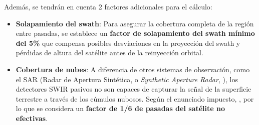 Además, se tendrán en cuenta 2 factores adicionales para el cálculo:
\begin{itemize}
    \item \textbf{Solapamiento del swath}: Para asegurar la cobertura completa de la región entre pasadas, se establece un \textbf{factor de solapamiento del swath mínimo del 5\%} que compensa posibles desviaciones en la proyección del swath y pérdidas de altura del satélite antes de la reinyección orbital.
    \item \textbf{Cobertura de nubes}: A diferencia de otros sistemas de observación, como el SAR (Radar de Apertura Sintética, o \textit{Synthetic Aperture Radar}, \cite{lou2020sar}), los detectores SWIR pasivos no son capaces de capturar la señal de la superficie terrestre a través de los cúmulos nubosos. Según el enunciado impuesto, , por lo que se considera un \textbf{factor de 1/6 de pasadas del satélite no efectivas}.
\end{itemize}

